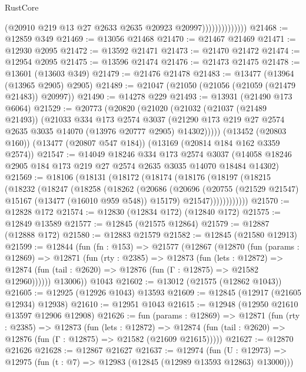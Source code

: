 \begin{lexlean}{RustCore}
\begin{coremodule}
                              (@20910 @219 @13 @27 @2633 @2635 @20923 @20997))))))))))))))
@21468 := @12859 @349
@21469 := @13056 @21468
@21470 := @21467 @21469
@21471 := @12930 @2095
@21472 := @13592 @21471
@21473 := @21470 @21472
@21474 := @12954 @2095
@21475 := @13596 @21474
@21476 := @21473 @21475
@21478 := @13601 (@13603 @349)
@21479 := @21476 @21478
@21483 := @13477 (@13964 (@13965 @2905) @2905)
@21489 := @21047 (@21050 (@21056 (@21059 (@21479 @21483)) @20997))
@21490 := @14278 @229
@21493 := @13931 (@21490 @173 @6064)
@21529 := @20773
    (@20820
      (@21020
        (@21032
          (@21037 (@21489 @21493))
          (@21033
            @334
            @173
            @2574
            @3037
            (@21290 @173 @219 @27 @2574 @2635 @3035 @14070 (@13976 @20777 @2905) @14302)))))
    (@13452 (@20803 @160))
    (@13477 (@20807 @547 @184))
    (@13169 (@20814 @184 @162 @3359 @2574))
@21547 := @14049
    @18246
    @334
    @173
    @2574
    @3037
    (@14058 @18246 @2905 @184 @173 @219 @27 @2574 @2635 @3035 @14070 @18484 @14302)
@21569 := @18106
    (@18131
      (@18172
        (@18174
          (@18176
            (@18197
              (@18215
                (@18232
                  (@18247
                    (@18258
                      (@18262
                        (@20686
                          (@20696
                            (@20755 (@21529 @21547) @15167 (@13477 (@16010 @959 @548)) @15179)
                            @21547))))))))))))
@21570 := @12828 @172
@21574 := @12830 (@12834 @172) (@12840 @172)
@21575 := @12849 @13589
@21577 := @12845 (@21575 @12864)
@21579 := @12887 (@12888 @172)
@21580 := @12883 @21579
@21582 := @12845 (@21580 @12913)
@21599 := @12844
    (fun (fn : @153) =>
    @21577
      (@12867
        (@12870
          (fun (params : @12869) =>
          @12871
            (fun (rty : @2385) =>
            @12873
              (fun (lets : @12872) =>
              @12874 (fun (tail : @2620) => @12876 (fun (Γ : @12875) => @21582 @12960))))))
        @13006))
    @1043
@21602 := @13012 (@21575 (@12862 @1043))
@21605 := @12925 (@12926 @1043) @13593
@21609 := @12845 (@12917 (@21605 @12934) @12938)
@21610 := @12951 @1043
@21615 := @12948 (@12950 @21610 @13597 @12906 @12908)
@21626 := fun (params : @12869) =>
  @12871
    (fun (rty : @2385) =>
    @12873
      (fun (lets : @12872) =>
      @12874 (fun (tail : @2620) => @12876 (fun (Γ : @12875) => @21582 (@21609 @21615)))))
@21627 := @12870 @21626
@21628 := @12867 @21627
@21637 := @12974
    (fun (U : @12973) => @12975 (fun (t : @7) => @12983 (@12845 (@12989 @13593 @12863) @13000)))

\end{coremodule}
\end{lexlean}
